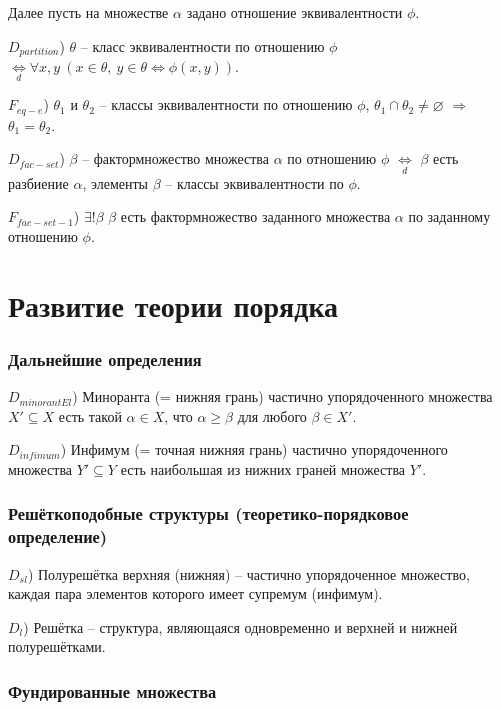 \documentclass[a4paper]{article}
\newcommand{\Def}[0]{\underset{d}{\Leftrightarrow}}
\begin{document}
Далее пусть на множестве $\alpha$ задано отношение эквивалентности $\phi$.

$D_{partition}$) $\theta$ -- класс эквивалентности по отношению $\phi$ $\Def \forall x, y~(x \in \theta,~y \in \theta \Leftrightarrow \phi(x, y))$.

$F_{eq-e}$) $\theta_1$ и $\theta_2$ -- классы эквивалентности по отношению $\phi$, $\theta_1 \cap \theta_2 \neq \varnothing$ $\Rightarrow$ $\theta_1 = \theta_2$.

$D_{fac-set}$) $\beta$ -- фактормножество множества $\alpha$ по отношению $\phi$ $\Def$ $\beta$ есть разбиение $\alpha$, элементы $\beta$ -- классы эквивалентности по $\phi$.

$F_{fac-set-1}$) $\exists! \beta$ $\beta$ есть фактормножество заданного множества $\alpha$ по заданному отношению $\phi$.

\clearpage


\part{Развитие теории порядка}

\section{Дальнейшие определения}

$D_{minorantEl}$) Миноранта (= нижняя грань) частично упорядоченного множества $X' \subseteq X$ есть такой $\alpha \in X$, что $\alpha \geqslant \beta$ для любого $\beta \in X'$.

$D_{infimum}$) Инфимум (= точная нижняя грань) частично упорядоченного множества $Y' \subseteq Y$ есть наибольшая из нижних граней множества $Y'$.

\section{Решёткоподобные структуры (теоретико-порядковое определение)}

$D_{sl}$) Полурешётка верхняя (нижняя) -- частично упорядоченное множество, каждая пара элементов которого имеет супремум (инфимум).

$D_{l}$) Решётка -- структура, являющаяся одновременно и верхней и нижней полурешётками.

\section{Фундированные множества}
\end{document}
